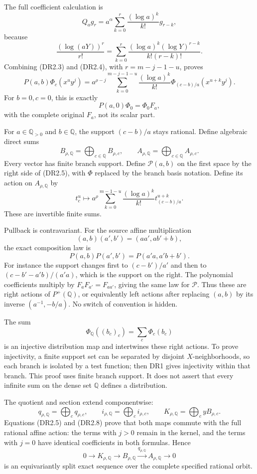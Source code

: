 The full coefficient calculation is \[
 Q_ag_r
  =a^\alpha
       \sum_{k=0}^{r}\frac{(\log a)^k}{k!}g_{r-k},
\tag{DR2.4}
\] because \[
 \frac{(\log(aY))^r}{r!}
   =\sum_{k=0}^r
      \frac{(\log a)^k(\log Y)^{r-k}}{k!(r-k)!}.
\] Combining (DR2.3) and (DR2.4), with \(r=m-j-1-u\), proves \[
 \boxed{
 P(a,b)\Phi_c(x^u y^j)
  =a^{\rho-j}
    \sum_{k=0}^{m-j-1-u}
      \frac{(\log a)^k}{k!}
        \Phi_{(c-b)/a}(x^{u+k}y^j).
 }
\tag{DR2.5}
\] For \(b=0,c=0\), this is exactly \[
 P(a,0)\Phi_0=\Phi_0 F_a,
\tag{DR2.6}
\] with the complete original \(F_a\), not its scalar part.

For \(a\in\mathbb Q_{>0}\) and \(b\in\mathbb Q\), the support
\((c-b)/a\) stays rational. Define algebraic direct sums \[
 B_{\rho,\mathbb Q}=\bigoplus_{c\in\mathbb Q}B_{\rho,c},
 \qquad A_{\rho,\mathbb Q}=\bigoplus_{c\in\mathbb Q}A_{\rho,c}.
\tag{DR2.7}
\] Every vector has finite branch support. Define \(\mathcal P(a,b)\) on
the first space by the right side of (DR2.5), with \(\Phi\) replaced by
the branch basis notation. Define its action on \(A_{\rho,\mathbb Q}\)
by \[
 t_c^u\longmapsto
 a^\rho\sum_{k=0}^{m-1-u}
       \frac{(\log a)^k}{k!}t_{(c-b)/a}^{u+k}.
\tag{DR2.8}
\] These are invertible finite sums.

Pullback is contravariant. For the source affine multiplication \[
 (a,b)(a',b')=(aa',ab'+b),
\] the exact composition law is \[
 P(a,b)P(a',b')
    =P(a'a,a'b+b').
\tag{DR2.9}
\] For instance the support changes first to \((c-b')/a'\) and then to
\((c-b'-a'b)/(a'a)\), which is the support on the right. The polynomial
coefficients multiply by \(F_aF_{a'}=F_{aa'}\), giving the same law for
\(\mathcal P\). Thus these are right actions of \(P^+(\mathbb Q)\), or
equivalently left actions after replacing \((a,b)\) by its inverse
\((a^{-1},-b/a)\). No switch of convention is hidden.

The sum \[
 \Phi_{\mathbb Q}((b_c)_c)=\sum_c\Phi_c(b_c)
\tag{DR2.10}
\] is an injective distribution map and intertwines these right actions.
To prove injectivity, a finite support set can be separated by disjoint
\(X\)-neighborhoods, so each branch is isolated by a test function; then
DR1 gives injectivity within that branch. This proof uses finite branch
support. It does not assert that every infinite sum on the dense set
\(\mathbb Q\) defines a distribution.

The quotient and section extend componentwise: \[
 q_{\rho,\mathbb Q}=\bigoplus_cq_{\rho,c},
 \qquad i_{\rho,\mathbb Q}=\bigoplus_ci_{\rho,c},
 \qquad K_{\rho,\mathbb Q}=\bigoplus_c yB_{\rho,c}.
\tag{DR2.11}
\] Equations (DR2.5) and (DR2.8) prove that both maps commute with the
full rational affine action: the terms with \(j>0\) remain in the
kernel, and the terms with \(j=0\) have identical coefficients in both
formulas. Hence \[
 0\longrightarrow K_{\rho,\mathbb Q}
 \longrightarrow B_{\rho,\mathbb Q}
 \xrightarrow{q_{\rho,\mathbb Q}}A_{\rho,\mathbb Q}
 \longrightarrow0
\tag{DR2.12}
\] is an equivariantly split exact sequence over the complete specified
rational orbit.

